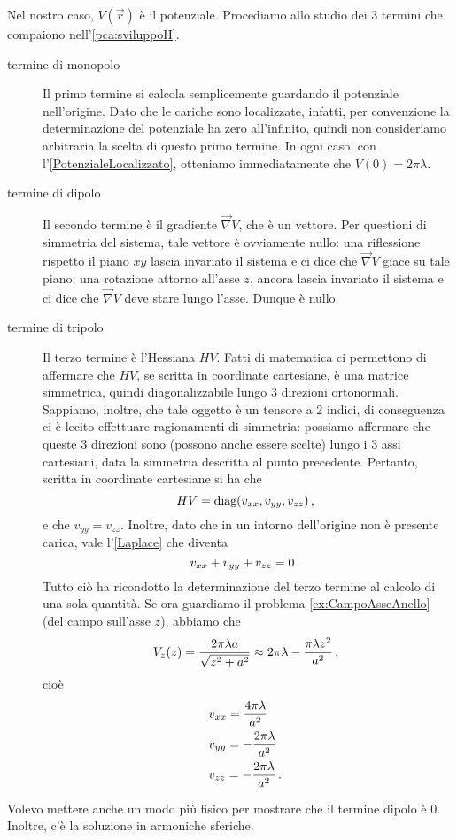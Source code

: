 \documentclass[../main.tex]{subfiles}
\begin{document}
Nel nostro caso, $V(\vec{r})$ è il potenziale. Procediamo allo studio dei 3 termini che compaiono nell'\cref{pca:sviluppoII}.
\begin{description}
	\item [termine di monopolo] Il primo termine si calcola semplicemente guardando il potenziale nell'origine. Dato che le cariche sono localizzate, infatti, per convenzione la determinazione del potenziale ha zero all'infinito, quindi non consideriamo arbitraria la scelta di questo primo termine. In ogni caso, con l'\cref{PotenzialeLocalizzato}, otteniamo immediatamente che $V(0)=2\pi\lambda$.
	\item [termine di dipolo] Il secondo termine è il gradiente $\vec{\nabla}V$, che è un vettore. Per questioni di simmetria del sistema, tale vettore è ovviamente nullo: una riflessione rispetto il piano $xy$ lascia invariato il sistema e ci dice che $\vec{\nabla}V$ giace su tale piano; una rotazione attorno all'asse $z$, ancora lascia invariato il sistema e ci dice che $\vec{\nabla}V$ deve stare lungo l'asse. Dunque è nullo.
	\item [termine di tripolo] Il terzo termine è l'Hessiana $H V$. Fatti di matematica ci permettono di affermare che $H V$, se scritta in coordinate cartesiane, è una matrice simmetrica, quindi diagonalizzabile lungo 3 direzioni ortonormali. Sappiamo, inoltre, che tale oggetto è un tensore a 2 indici, di conseguenza ci è lecito effettuare ragionamenti di simmetria: possiamo affermare che queste 3 direzioni sono (possono anche essere scelte) lungo i 3 assi cartesiani, data la simmetria descritta al punto precedente. Pertanto, scritta in coordinate cartesiane si ha che
	\[
		H V = \text{diag}(v_{xx},v_{yy},v_{zz})\, \text{, }
	\]
	e che $v_{yy}=v_{zz}$. Inoltre, dato che in un intorno dell'origine non è presente carica, vale l'\cref{Laplace} che diventa
	\[
		v_{xx}+v_{yy}+v_{zz}=0\, \text{. }
	\]
	Tutto ciò ha ricondotto la determinazione del terzo termine al calcolo di una sola quantità. Se ora guardiamo il problema \ref{ex:CampoAsseAnello} (del campo sull'asse $z$), abbiamo che
	\[
		V_z(z)=\frac{2\pi\lambda a}{\sqrt{z^2+a^2}} \approx 2 \pi \lambda - \frac{\pi \lambda z^2}{a^2}\, \text{, }
	\]
	cioè
	\begin{align*}
		&v_{xx}= \frac{4\pi\lambda}{a^2}\\
		&v_{yy}= -\frac{2\pi\lambda}{a^2}\\
		&v_{zz}= -\frac{2\pi\lambda}{a^2}\, \text{. }
	\end{align*}
\end{description}

\begin{remark}
	Volevo mettere anche un modo più fisico per mostrare che il termine dipolo è 0. Inoltre, c'è la soluzione in armoniche sferiche.
\end{remark}
\end{document}

